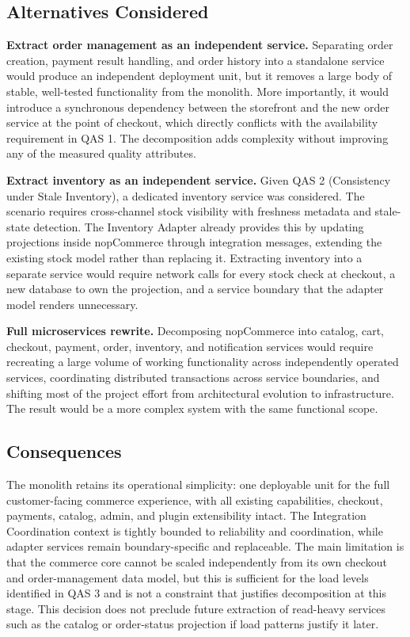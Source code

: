 \subsection{Alternatives Considered}

\textbf{Extract order management as an independent service.} Separating order creation, payment
result handling, and order history into a standalone service would produce an independent
deployment unit, but it removes a large body of stable, well-tested functionality from the
monolith. More importantly, it would introduce a synchronous dependency between the storefront
and the new order service at the point of checkout, which directly conflicts with the
availability requirement in QAS 1. The decomposition adds complexity without improving
any of the measured quality attributes.

\textbf{Extract inventory as an independent service.} Given QAS 2 (Consistency under
Stale Inventory), a dedicated inventory service was considered. The scenario requires
cross-channel stock visibility with freshness metadata and stale-state detection. The Inventory
Adapter already provides this by updating projections inside nopCommerce through integration
messages, extending the existing stock model rather than replacing it. Extracting inventory
into a separate service would require network calls for every stock check at checkout, a new
database to own the projection, and a service boundary that the adapter model renders
unnecessary.

\textbf{Full microservices rewrite.} Decomposing nopCommerce into catalog, cart, checkout,
payment, order, inventory, and notification services would require recreating a large volume of
working functionality across independently operated services, coordinating distributed
transactions across service boundaries, and shifting most of the project effort from
architectural evolution to infrastructure. The result would be a more complex system with the
same functional scope.

\subsection{Consequences}

The monolith retains its operational simplicity: one deployable unit for the full
customer-facing commerce experience, with all existing capabilities, checkout, payments,
catalog, admin, and plugin extensibility intact. The Integration Coordination context is tightly
bounded to reliability and coordination, while adapter services remain boundary-specific and
replaceable. The main limitation is that the commerce core cannot be scaled independently from
its own checkout and order-management data model, but this is sufficient for the load levels
identified in QAS 3 and is not a constraint that justifies decomposition at this stage.
This decision does not preclude future extraction of read-heavy services such as the catalog or
order-status projection if load patterns justify it later.

